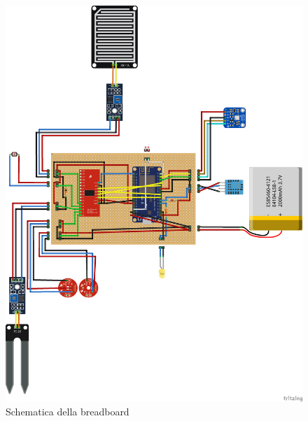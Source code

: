 \documentclass[fleqn, 12pt]{SelfArx}
\begin{document}
\begin{figure}[htb]
\centering
\includegraphics[scale=0.25]{hardware/iot_project_bb.png}
\caption{Schematica della breadboard}
\label{fig:breadboard}
\end{figure}
\end{document}
